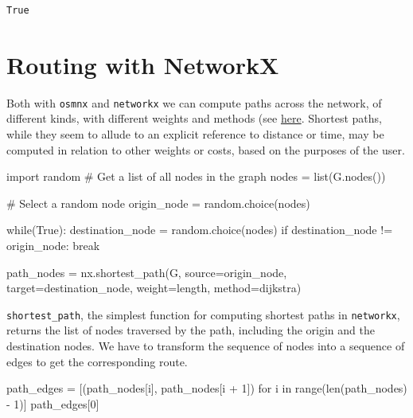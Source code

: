 \documentclass[
  letterpaper,
  DIV=11,
  numbers=noendperiod]{scrreprt}
\newenvironment{Shaded}{\begin{snugshade}}{\end{snugshade}}
\newcommand{\BuiltInTok}[1]{\textcolor[rgb]{0.00,0.23,0.31}{#1}}
\newcommand{\CommentTok}[1]{\textcolor[rgb]{0.37,0.37,0.37}{#1}}
\newcommand{\ControlFlowTok}[1]{\textcolor[rgb]{0.00,0.23,0.31}{#1}}
\newcommand{\DecValTok}[1]{\textcolor[rgb]{0.68,0.00,0.00}{#1}}
\newcommand{\ImportTok}[1]{\textcolor[rgb]{0.00,0.46,0.62}{#1}}
\newcommand{\KeywordTok}[1]{\textcolor[rgb]{0.00,0.23,0.31}{#1}}
\newcommand{\NormalTok}[1]{\textcolor[rgb]{0.00,0.23,0.31}{#1}}
\newcommand{\OperatorTok}[1]{\textcolor[rgb]{0.37,0.37,0.37}{#1}}
\newcommand{\StringTok}[1]{\textcolor[rgb]{0.13,0.47,0.30}{#1}}
\newcommand{\VariableTok}[1]{\textcolor[rgb]{0.07,0.07,0.07}{#1}}
\begin{document}
\begin{verbatim}
True
\end{verbatim}

\section{Routing with NetworkX}\label{routing-with-networkx}

Both with \texttt{osmnx} and \texttt{networkx} we can compute paths
across the network, of different kinds, with different weights and
methods (see
\href{https://networkx.org/documentation/stable/reference/algorithms/shortest_paths.html}{here}.
Shortest paths, while they seem to allude to an explicit reference to
distance or time, may be computed in relation to other weights or costs,
based on the purposes of the user.

\begin{Shaded}
\begin{Highlighting}[]
\ImportTok{import}\NormalTok{ random}
\CommentTok{\# Get a list of all nodes in the graph}
\NormalTok{nodes }\OperatorTok{=} \BuiltInTok{list}\NormalTok{(G.nodes())}

\CommentTok{\# Select a random node}
\NormalTok{origin\_node }\OperatorTok{=}\NormalTok{ random.choice(nodes)}

\ControlFlowTok{while}\NormalTok{(}\VariableTok{True}\NormalTok{):}
\NormalTok{    destination\_node }\OperatorTok{=}\NormalTok{ random.choice(nodes)}
    \ControlFlowTok{if}\NormalTok{ destination\_node }\OperatorTok{!=}\NormalTok{ origin\_node:}
        \ControlFlowTok{break}

\NormalTok{path\_nodes }\OperatorTok{=}\NormalTok{ nx.shortest\_path(G, source}\OperatorTok{=}\NormalTok{origin\_node, target}\OperatorTok{=}\NormalTok{destination\_node, weight}\OperatorTok{=}\StringTok{\textquotesingle{}length\textquotesingle{}}\NormalTok{, method}\OperatorTok{=}\StringTok{\textquotesingle{}dijkstra\textquotesingle{}}\NormalTok{)}
\end{Highlighting}
\end{Shaded}

\texttt{shortest\_path}, the simplest function for computing shortest
paths in \texttt{networkx}, returns the list of nodes traversed by the
path, including the origin and the destination nodes. We have to
transform the sequence of nodes into a sequence of edges to get the
corresponding route.

\begin{Shaded}
\begin{Highlighting}[]
\NormalTok{path\_edges }\OperatorTok{=}\NormalTok{ [(path\_nodes[i], path\_nodes[i }\OperatorTok{+} \DecValTok{1}\NormalTok{]) }\ControlFlowTok{for}\NormalTok{ i }\KeywordTok{in} \BuiltInTok{range}\NormalTok{(}\BuiltInTok{len}\NormalTok{(path\_nodes) }\OperatorTok{{-}} \DecValTok{1}\NormalTok{)] }
\NormalTok{path\_edges[}\DecValTok{0}\NormalTok{]}
\end{Highlighting}
\end{Shaded}
\end{document}
